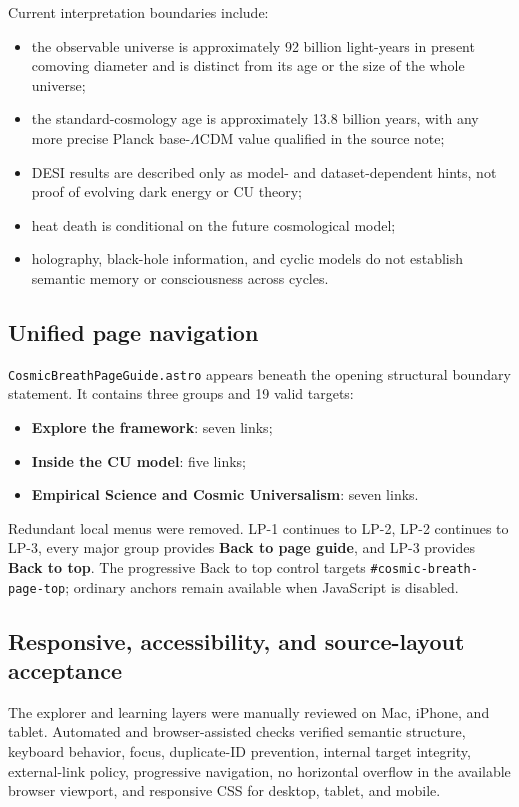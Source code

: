 \documentclass[11pt,letterpaper]{article}
\newcommand{\filepath}[1]{\nolinkurl{#1}}
\newcommand{\term}[1]{\textbf{\textsf{#1}}}
\begin{document}
Current interpretation boundaries include:

\begin{itemize}
    \item the observable universe is approximately 92 billion light-years in present comoving diameter and is distinct from its age or the size of the whole universe;
    \item the standard-cosmology age is approximately 13.8 billion years, with any more precise Planck base-$\Lambda$CDM value qualified in the source note;
    \item DESI results are described only as model- and dataset-dependent hints, not proof of evolving dark energy or CU theory;
    \item heat death is conditional on the future cosmological model;
    \item holography, black-hole information, and cyclic models do not establish semantic memory or consciousness across cycles.
\end{itemize}

\subsection{Unified page navigation}

\filepath{CosmicBreathPageGuide.astro} appears beneath the opening structural
boundary statement. It contains three groups and 19 valid targets:

\begin{itemize}
    \item \term{Explore the framework}: seven links;
    \item \term{Inside the CU model}: five links;
    \item \term{Empirical Science and Cosmic Universalism}: seven links.
\end{itemize}

Redundant local menus were removed. LP-1 continues to LP-2, LP-2 continues to
LP-3, every major group provides \term{Back to page guide}, and LP-3 provides
\term{Back to top}. The progressive Back to top control targets
\filepath{\#cosmic-breath-page-top}; ordinary anchors remain available when
JavaScript is disabled.

\subsection{Responsive, accessibility, and source-layout acceptance}

The explorer and learning layers were manually reviewed on Mac, iPhone, and
tablet. Automated and browser-assisted checks verified semantic structure,
keyboard behavior, focus, duplicate-ID prevention, internal target integrity,
external-link policy, progressive navigation, no horizontal overflow in the
available browser viewport, and responsive CSS for desktop, tablet, and mobile.
\end{document}
